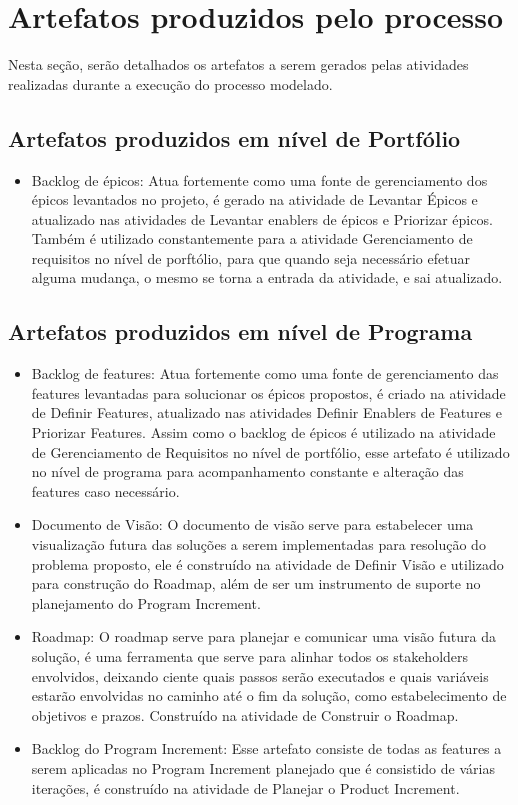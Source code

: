 \section{Artefatos produzidos pelo processo}

Nesta seção, serão detalhados os artefatos a serem gerados pelas atividades realizadas durante 
a execução do processo modelado.
\subsection{Artefatos produzidos em nível de Portfólio}
\begin{itemize}
\item Backlog de épicos: Atua fortemente como uma fonte de gerenciamento dos épicos levantados no projeto, é gerado na atividade de Levantar Épicos e atualizado nas atividades de Levantar enablers de épicos e Priorizar épicos. Também é utilizado constantemente para a atividade Gerenciamento de requisitos no nível de porftólio, para que quando seja necessário efetuar alguma mudança, o mesmo se torna a entrada da atividade, e sai atualizado.
\end{itemize}


\subsection{Artefatos produzidos em nível de Programa}
\begin{itemize}
\item Backlog de features: Atua fortemente como uma fonte de gerenciamento das features levantadas para solucionar os épicos propostos, é criado na atividade de Definir Features,
atualizado nas atividades Definir Enablers de Features e Priorizar Features. Assim como o backlog de épicos é utilizado na atividade de Gerenciamento de Requisitos no nível de portfólio, esse artefato é utilizado no nível de programa para acompanhamento constante e alteração das features caso necessário.

\item Documento de Visão: O documento de visão serve para estabelecer uma visualização futura das soluções a serem implementadas para resolução do problema proposto, ele é construído na atividade de Definir Visão e utilizado para construção do Roadmap, além de ser um instrumento de suporte no planejamento do Program Increment.

\item Roadmap: O roadmap serve para planejar e comunicar uma visão futura da solução, é uma ferramenta que serve para alinhar todos os stakeholders envolvidos, deixando ciente quais passos serão executados e quais variáveis estarão envolvidas no caminho até o fim da solução, como estabelecimento de objetivos e prazos. Construído na atividade de Construir o Roadmap.

\item Backlog do Program Increment: Esse artefato consiste de todas as features a serem aplicadas no Program Increment planejado que é consistido de várias iterações, é construído na atividade de Planejar o Product Increment.

\end{itemize}

